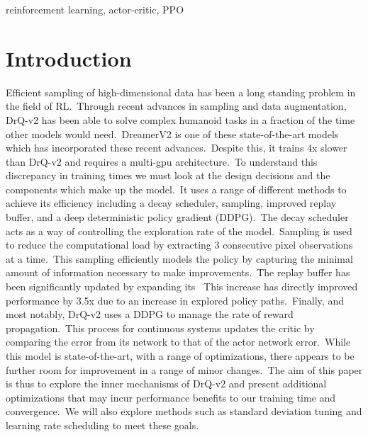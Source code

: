 \documentclass[conference]{./IEEEtran/IEEEtran} %
\begin{document}
    \begin{IEEEkeywords}
        reinforcement learning, actor-critic, PPO
    \end{IEEEkeywords}

    \section{Introduction}\label{sec:introduction}






    Efficient sampling of high-dimensional data has been a long standing problem in the field of RL.\ Through recent advances in
    sampling and data augmentation, DrQ-v2 has been able to solve complex humanoid tasks in a fraction of the time other models
    would need.\ DreamerV2 is one of these state-of-the-art models which has incorporated these recent advances.\ Despite this, it
    trains 4x slower than DrQ-v2 and requires a multi-gpu architecture.\ To understand this discrepancy in training times we must
    look at the design decisions and the components which make up the model.\ It uses a range of different methods to achieve its
    efficiency including a decay scheduler, sampling, improved replay buffer, and a deep deterministic policy gradient (DDPG).\
    The decay scheduler acts as a way of controlling the exploration rate of the model.\ Sampling is used to reduce the computational
    load by extracting 3 consecutive pixel observations at a time.\ This sampling efficiently models the policy by capturing the
    minimal amount of information necessary to make improvements.\ The replay buffer has been significantly updated by expanding
    its \ This increase has directly improved performance by 3.5x due to an increase in explored policy paths.\ Finally, and
    most notably, DrQ-v2 uses a DDPG to manage the rate of reward propagation.\ This process for continuous systems updates the
    critic by comparing the error from its network to that of the actor network error.\
    While this model is state-of-the-art, with a range of optimizations, there appears to be further room for improvement in a
    range of minor changes.\ The aim of this paper is thus to explore the inner mechanisms of DrQ-v2 and present additional optimizations
    that may incur performance benefits to our training time and convergence.\ We will also explore methods such as standard deviation
    tuning and learning rate scheduling to meet these goals.
\end{document}
